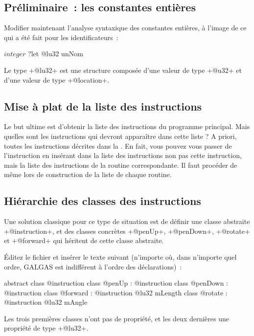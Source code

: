\subsection{Préliminaire~: les constantes entières}

Modifier maintenant l’analyse syntaxique des constantes entières, à l’image de ce qui a été fait pour les identificateurs~:
\begin{galgas4}
$integer$ ?let @lu32 unNom
\end{galgas4}

Le type \ggsq+@lu32+ est une structure composée d’une valeur de type \ggsq+@u32+ et d’une valeur de type \ggsq+@location+.

\subsection{Mise à plat de la liste des instructions}
Le but ultime est d'obtenir la liste des instructions du programme principal. Mais quelles sont les instructions qui devront apparaître dans cette liste ? A priori, toutes les instructions décrites dans la . En fait, vous pouvez vous passer de l'instruction  en insérant dans la liste des instructions non pas cette instruction, mais la liste des instructions de la routine correspondante. Il faut procéder de même lors de construction de la liste de chaque routine.

\subsection{Hiérarchie des classes des instructions}
Une solution classique pour ce type de situation est de définir une classe abstraite \ggsq+@instruction+, et des classes concrètes \ggsq+@penUp+, \ggsq+@penDown+, \ggsq+@rotate+ et \ggsq+@forward+ qui héritent de cette classe abstraite.

Éditez le fichier  et insérer le texte suivant (n’importe où, dans n’importe quel ordre, GALGAS est indifférent à l’ordre des déclarations)~:

\begin{galgas4}
abstract class @instruction {
}
class @penUp : @instruction {
}
class @penDown : @instruction {
}
class @forward : @instruction {
  @lu32 mLength
}
class @rotate : @instruction {
  @lu32 mAngle
}
\end{galgas4}


Les trois premières classes n'ont pas de propriété, et les deux dernières une propriété de type \ggsq+@lu32+.

